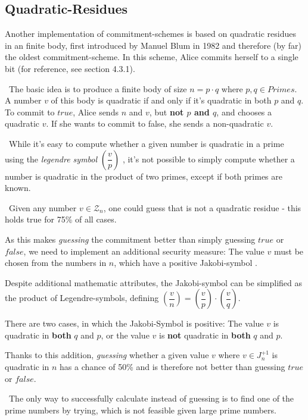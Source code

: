 \subsection{Quadratic-Residues}
Another implementation of commitment-schemes is based on quadratic residues in an finite body, first introduced by Manuel Blum in 1982 \cite{Blum82} and therefore (by far) the oldest commitment-scheme. In this scheme, Alice commits herself to a single bit (for reference, see \cite{DeHa15} section 4.3.1). 

~\newline The basic idea is to produce a finite body of size $n = p \cdot q $ where $p,q \in Primes$. A number $v$ of this body is quadratic if and only if it's quadratic in both $p$ and $q$. To commit to $true$, Alice sends $n$ and $v$, but \textbf{not $p$ and $q$}, and chooses a quadratic $v$. If she wants to commit to false, she sends a non-quadratic $v$. 

~\newline While it's easy to compute whether a given number is quadratic in a prime using the \textit{legendre symbol} $(\dfrac{v}{p})$ \cite{PrGloLeg}, it's not possible to simply compute whether a number is quadratic in the product of two primes, except if both primes are known. 

~\newline Given any number $v \in \mathcal{Z}_n$, one could guess that is not a quadratic residue - this holds true for 75\% of all cases. 

As this makes \textit{guessing} the commitment better than simply guessing $true$ or $false$, we need to implement an additional security measure: The value $v$ must be chosen from the numbers in $n$, which have a positive Jakobi-symbol \cite{PrGloJak}. 

Despite additional mathematic attributes, the Jakobi-symbol can be simplified as the product of Legendre-symbols, defining $(\dfrac{v}{n})= (\dfrac{v}{p})\cdot (\dfrac{v}{q})$.

There are two cases, in which the Jakobi-Symbol is positive: The value $v$ is quadratic in \textbf{both} $q$ and $p$, or the value $v$ is \textbf{not} quadratic in \textbf{both} $q$ and $p$. 

Thanks to this addition, \textit{guessing} whether a given value $v$ where $v \in J_n^{+1}$ is quadratic in $n$ has a chance of 50\% and is therefore not better than guessing $true$ or $false$. 

~\newline The only way to successfully calculate instead of guessing is to find one of the prime numbers by trying, which is not feasible given large prime numbers.

